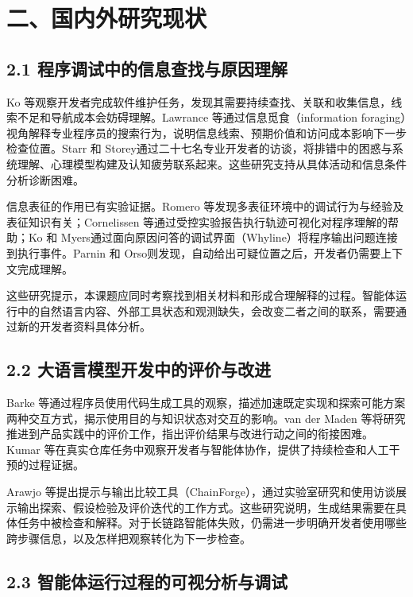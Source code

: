 \section{二、国内外研究现状}

\subsection{2.1 程序调试中的信息查找与原因理解}

Ko 等\cite{ref14}观察开发者完成软件维护任务，发现其需要持续查找、关联和收集信息，线索不足和导航成本会妨碍理解。Lawrance 等\cite{ref08}通过信息觅食（information foraging）视角解释专业程序员的搜索行为，说明信息线索、预期价值和访问成本影响下一步检查位置。Starr 和 Storey\cite{ref16}通过二十七名专业开发者的访谈，将排错中的困惑与系统理解、心理模型构建及认知疲劳联系起来。这些研究支持从具体活动和信息条件分析诊断困难。

信息表征的作用已有实验证据。Romero 等\cite{ref34}发现多表征环境中的调试行为与经验及表征知识有关；Cornelissen 等\cite{ref33}通过受控实验报告执行轨迹可视化对程序理解的帮助；Ko 和 Myers\cite{ref07}通过面向原因问答的调试界面（Whyline）将程序输出问题连接到执行事件。Parnin 和 Orso\cite{ref35}则发现，自动给出可疑位置之后，开发者仍需要上下文完成理解。

这些研究提示，本课题应同时考察找到相关材料和形成合理解释的过程。智能体运行中的自然语言内容、外部工具状态和观测缺失，会改变二者之间的联系，需要通过新的开发者资料具体分析。

\subsection{2.2 大语言模型开发中的评价与改进}

Barke 等\cite{ref64}通过程序员使用代码生成工具的观察，描述加速既定实现和探索可能方案两种交互方式，揭示使用目的与知识状态对交互的影响。van der Maden 等\cite{ref01}将研究推进到产品实践中的评价工作，指出评价结果与改进行动之间的衔接困难。Kumar 等\cite{ref59}在真实仓库任务中观察开发者与智能体协作，提供了持续检查和人工干预的过程证据。

Arawjo 等\cite{arawjo2024chainforge}提出提示与输出比较工具（ChainForge），通过实验室研究和使用访谈展示输出探索、假设检验及评价迭代的工作方式。这些研究说明，生成结果需要在具体任务中被检查和解释。对于长链路智能体失败，仍需进一步明确开发者使用哪些跨步骤信息，以及怎样把观察转化为下一步检查。

\subsection{2.3 智能体运行过程的可视分析与调试}

